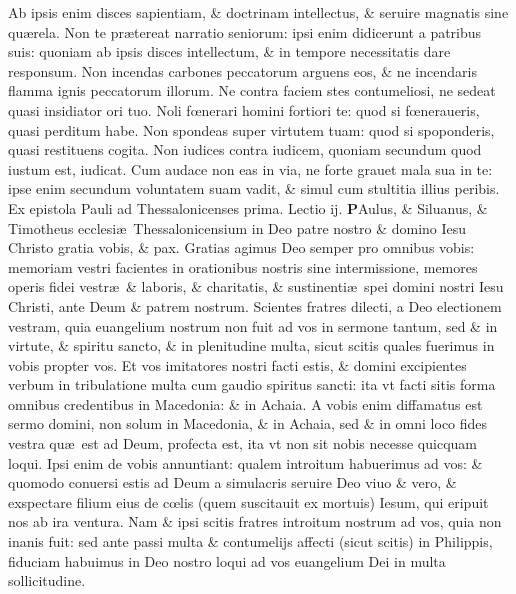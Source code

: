 \documentclass[a5paper,10pt]{book}
\def\rightmarginnote{%
	\lrmarginnote{\hskip\columnwidth \hskip -1em}}
\def\ae{æ}
\def\oe{œ}
\begin{document}
\begin{multicols*}{2}
Ab ipsis enim disces sapientiam, \& doctrinam intellectus, \& seruire magnatis sine qu\ae rela.
Non te pr\ae tereat narratio seniorum: ipsi enim didicerunt a patribus suis: quoniam ab ipsis disces intellectum, \& in tempore necessitatis dare responsum.
Non incendas carbones peccatorum arguens eos, \& ne incendaris flamma ignis peccatorum illorum. Ne contra faciem stes contumeliosi, ne sedeat quasi insidiator ori tuo.
Noli f\oe nerari homini fortiori te: quod si f\oe neraueris, quasi perditum habe.
Non spondeas super virtutem tuam: quod si spoponderis, quasi restituens cogita. Non iudices contra iudicem, quoniam secundum quod iustum est, iudicat.
Cum audace non eas in via, ne forte grauet mala sua in te: ipse enim secundum
voluntatem suam vadit, \& simul cum stultitia illius peribis.
\newline {} \color{red} Ex epistola Pauli ad Thessalonicenses prima. \quad Lectio ij. \color{black}
\vspace{-1.25em}
\lettrine[lines=2]{\bfseries \color{red} P}{}Aulus,\rightmarginnote{ca. 1.} \& Siluanus, \& Timotheus ecclesi\ae \ Thessalonicensium in Deo patre nostro \& domino Iesu Christo gratia vobis, \& pax.
Gratias agimus Deo semper pro omnibus vobis: memoriam vestri facientes in orationibus nostris sine intermissione, memores operis fidei vestr\ae \ \& laboris, \& charitatis, \& sustinenti\ae \ spei domini nostri Iesu Christi, ante Deum \& patrem nostrum.
Scientes fratres dilecti, a Deo electionem vestram, quia euangelium nostrum non fuit ad vos in sermone tantum, sed \& in virtute, \& spiritu sancto, \& in plenitudine multa, sicut scitis quales fuerimus in vobis propter vos.
Et vos imitatores nostri facti estis, \& domini excipientes verbum in tribulatione multa cum gaudio spiritus sancti: ita vt facti sitis forma omnibus credentibus in Macedonia: \& in Achaia.
A vobis enim diffamatus est sermo domini, non solum in Macedonia, \& in Achaia, sed \& in omni loco fides vestra qu\ae \ est ad Deum, profecta est, ita vt non sit nobis necesse quicquam loqui.
Ipsi enim de vobis annuntiant: qualem introitum habuerimus ad vos: \& quomodo conuersi estis ad Deum a simulacris seruire Deo viuo \& vero, \& exspectare filium eius de c\oe lis (quem suscitauit ex mortuis) Iesum, qui eripuit nos ab ira ventura.
\newline \indent Nam\rightmarginnote{ca. 2.} \& ipsi scitis fratres introitum nostrum ad vos, quia non inanis fuit: sed ante passi multa \& contumelijs affecti (sicut scitis) in Philippis, fiduciam habuimus in Deo nostro loqui ad vos euangelium Dei in multa sollicitudine.

\end{multicols*}
\end{document}

